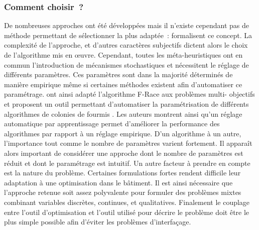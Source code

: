 \subsubsection{Comment choisir~?} %
\label{ssub:comment_choisir_}
De nombreuses approches ont été développées mais il n’existe cependant pas de
méthode permettant de sélectionner la plus adaptée~: \textcite{Wolpert199767}
formalisent ce concept. La complexité de l’approche, et d’autres caractères
subjectifs dictent alors le choix de l’algorithme mis en œuvre. Cependant, toutes
les méta-heuristiques ont en commun l’introduction de mécanismes stochastiques
et nécessitent le réglage de différents paramètres. Ces paramètres sont dans la
majorité déterminés de manière empirique même si certaines méthodes
existent afin d’automatiser ce paramétrage. \textcite{Lopez-Ibanez2012861} ont ainsi
adapté l’algorithme F-Race \parencite{Birattari2010311} aux problèmes multi-
objectifs et proposent un outil permettant d’automatiser la paramétrisation de
différents algorithmes de colonies de fourmis \parencite{Lopez-Ibanez2012861}.
Les auteurs montrent ainsi qu’un réglage automatique par apprentissage permet
d’améliorer la performance des algorithmes par rapport à un réglage empirique.
D’un algorithme à un autre, l’importance tout comme le nombre de paramètres
varient fortement. Il apparaît alors important de considérer une approche dont le
nombre de paramètres est réduit et dont le paramétrage est intuitif. Un autre
facteur à prendre en compte est la nature du problème. Certaines formulations
fortes rendent difficile leur adaptation à une optimisation dans le bâtiment. Il
est ainsi nécessaire que l’approche retenue soit assez polyvalente pour formuler des
problèmes mixtes combinant variables discrètes, continues, et qualitatives.
Finalement le couplage entre l’outil d’optimisation et l’outil utilisé pour
décrire le problème doit être le plus simple possible afin d’éviter les
problèmes d’interfaçage.

